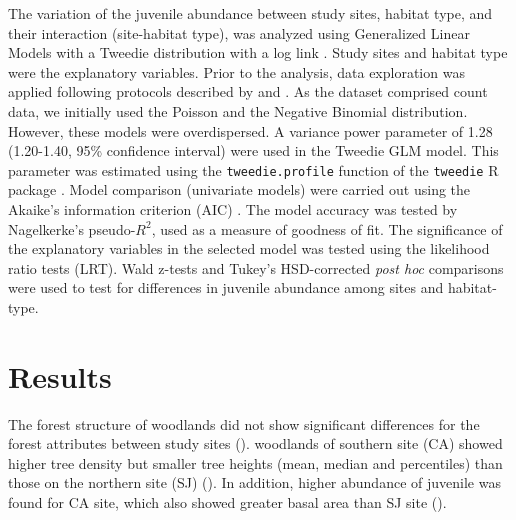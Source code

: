 The variation of the juvenile abundance between study sites, habitat type, and their interaction (site-habitat type), was analyzed using Generalized Linear Models with a Tweedie distribution with a log link \autocite{DunnSmyth2018TweedieGLMs}. Study sites and habitat type were the explanatory variables. Prior to the analysis, data exploration was applied following protocols described by \citet{Zuuretal2010ProtocolData} and \citet{IenoZuur2015BeginnerGuide}. As the dataset comprised count data, we initially used the Poisson and the Negative Binomial distribution. However, these models were overdispersed. A variance power parameter of 1.28 (1.20-1.40, 95\% confidence interval) were used in the Tweedie GLM model. This parameter was estimated using the \texttt{tweedie.profile} function of the \texttt{tweedie} R package \autocites{DunnSmyth2005SeriesEvaluation,Dunn2017Tweedie}. Model comparison (univariate models) were carried out using the Akaike's information criterion (AIC) \autocites{BurnhamAnderson2010ModelSelection}. The model accuracy was tested by Nagelkerke's pseudo-$R^2$, used as a measure of goodness of fit. The significance of the explanatory variables in the selected model was tested using the likelihood ratio tests (LRT). Wald z-tests and Tukey's HSD-corrected \emph{post hoc} comparisons were used to test for differences in juvenile abundance among sites and habitat-type. 


\section{Results}\label{sec:coloniza:results}

The forest structure of \Qpy woodlands did not show significant differences for the forest attributes between study sites  (). \Qpy woodlands of southern site (CA) showed higher tree density but smaller tree heights (mean, median and percentiles) than those on the northern site (SJ) (). In addition, higher abundance of juvenile was found for CA site, which also showed greater basal area than SJ site ().

